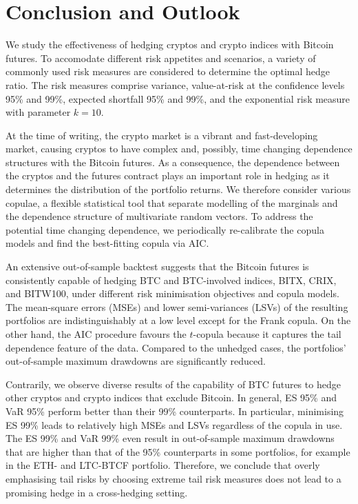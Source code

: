 \section{Conclusion and Outlook}\label{sec:conclusion-and-outlook}
We study the effectiveness of hedging cryptos and crypto indices with
Bitcoin futures.
To accomodate different risk appetites and scenarios, a variety of
commonly used risk measures are considered to determine the optimal
hedge ratio. The risk measures comprise variance, value-at-risk at
the confidence levels 95\% and 99\%, expected shortfall 95\% and 99\%,
and the exponential risk measure with parameter $k=10$.

At the time of writing, the crypto market is a vibrant and
fast-developing market, causing cryptos to have complex and, possibly,
time  changing dependence structures with the Bitcoin futures.
As a consequence, the dependence between the cryptos and the futures
contract plays an important role in hedging as it determines the
distribution of the portfolio returns. We therefore consider various
copulae, a flexible statistical tool that separate modelling of the
marginals and the dependence structure of multivariate random
vectors. To address the potential time changing dependence, we
periodically re-calibrate the copula models and find the best-fitting
copula via  AIC. 

An extensive out-of-sample backtest suggests that the Bitcoin futures
is consistently capable of hedging BTC and BTC-involved indices, 
BITX, CRIX, and BITW100, under different risk minimisation objectives
and copula models. The mean-square errors (MSEs) and lower
semi-variances (LSVs) of the resulting portfolios are
indistinguishably at a low level except for the Frank copula. 
On the other hand, the AIC procedure favours the $t$-copula because it 
captures the tail dependence feature of the data.
Compared to the unhedged cases, the
portfolios' out-of-sample maximum drawdowns are significantly reduced. 

Contrarily, we observe diverse results of the capability of BTC
futures to hedge other cryptos and crypto indices that exclude Bitcoin. 
In general, ES 95\% and VaR 95\% perform better than their 99\%
counterparts. In particular, minimising ES 99\% leads to relatively
high MSEs and LSVs regardless of the copula in use. The ES 99\% and
VaR 99\% even result in out-of-sample maximum drawdowns that are
higher than that of the 95\% counterparts in some portfolios, 
for example in the ETH- and LTC-BTCF portfolio.
Therefore, we conclude that overly emphasising tail risks by choosing
extreme tail risk measures does not lead to a promising hedge in a
cross-hedging setting. 

